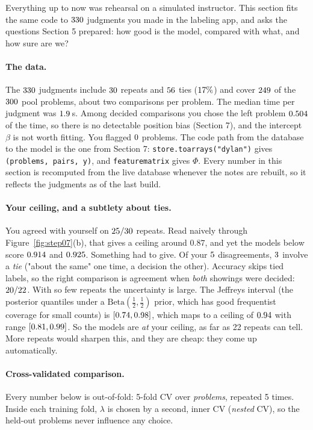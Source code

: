 \documentclass[11pt]{article}
\theoremstyle{definition}
\theoremstyle{plain}
\theoremstyle{remark}
\newcommand{\code}[1]{\texttt{#1}}
\renewcommand{\_}{\oldunderscore\allowbreak}
\begin{document}
Everything up to now was rehearsal on a simulated instructor. This section fits the same code to $330$ judgments you made in
the labeling app, and asks the questions Section 5 prepared: how good is the model, compared with what, and how sure are we?

\paragraph{The data.}
The $330$ judgments include $30$ repeats and $56$ ties ($17\%$) and cover $249$ of the $300$ pool problems, about two
comparisons per problem. The median time per judgment was $1.9$\,s. Among decided comparisons you chose the left problem $0.504$ of
the time, so there is no detectable position bias (Section 7), and the intercept $\beta$ is not worth fitting. You flagged $0$ problems.
The code path from the database to the model is the one from Section 7: \code{store.to\_arrays("dylan")} gives
\code{(problems, pairs, y)}, and \code{feature\_matrix} gives $\Phi$. Every number in this section is recomputed from the live database
whenever the notes are rebuilt, so it reflects the judgments as of the last build.

\paragraph{Your ceiling, and a subtlety about ties.}
You agreed with yourself on $25/30$ repeats. Read naively through Figure~\ref{fig:step07}(b), that gives a ceiling around $0.87$, and
yet the models below score $0.914$ and $0.925$. Something had to give. Of your $5$ disagreements, $3$ involve a \emph{tie} ("about the same" one time,
a decision the other). Accuracy skips tied labels, so the right comparison is agreement when \emph{both} showings were decided: $20/22$. With so few
repeats the uncertainty is large. The Jeffreys interval (the posterior quantiles under a $\mathrm{Beta}(\frac12,\frac12)$ prior, which has good frequentist coverage
for small counts) is $[0.74,0.98]$, which maps to a ceiling of $0.94$ with range $[0.81,0.99]$. So the models are
\emph{at} your ceiling, as far as 22 repeats can tell. More repeats would sharpen this, and they are cheap: they come up automatically.

\paragraph{Cross-validated comparison.}
Every number below is out-of-fold: 5-fold CV over \emph{problems}, repeated 5 times. Inside each training fold, $\lambda$ is chosen by a
second, inner CV (\emph{nested} CV), so the held-out problems never influence any choice.
\end{document}
